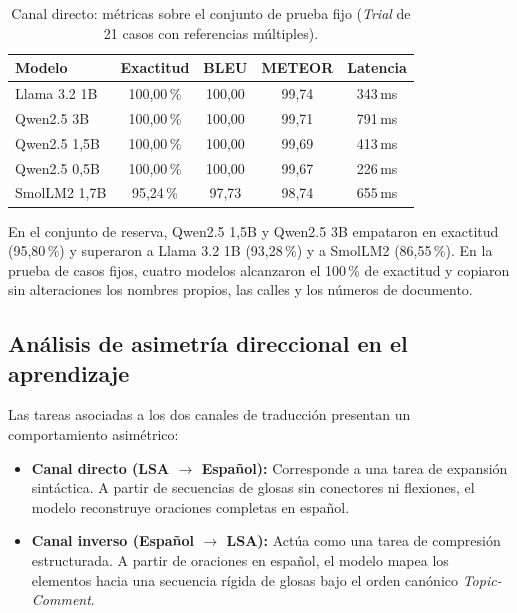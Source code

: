 \begin{table}[H]
    \centering
    \small
    \caption{Canal directo: métricas sobre el conjunto de prueba fijo (\textit{Trial} de 21 casos con referencias múltiples).}
    \label{tab:slm_trial_1310}
    \begin{tabular}{lcccc}
        \toprule
        \textbf{Modelo} & \textbf{Exactitud} & \textbf{BLEU} & \textbf{METEOR} & \textbf{Latencia} \\
        \midrule
        Llama 3.2 1B & 100{,}00\,\% & 100{,}00 & 99{,}74 & 343\,ms \\
        Qwen2.5 3B & 100{,}00\,\% & 100{,}00 & 99{,}71 & 791\,ms \\
        Qwen2.5 1,5B & 100{,}00\,\% & 100{,}00 & 99{,}69 & 413\,ms \\
        Qwen2.5 0,5B & 100{,}00\,\% & 100{,}00 & 99{,}67 & 226\,ms \\
        SmolLM2 1,7B & 95{,}24\,\% & 97{,}73 & 98{,}74 & 655\,ms \\
        \bottomrule
    \end{tabular}
\end{table}

En el conjunto de reserva, Qwen2.5 1,5B y Qwen2.5 3B empataron en exactitud (95{,}80\,\%) y superaron a Llama 3.2 1B (93{,}28\,\%) y a SmolLM2 (86{,}55\,\%). En la prueba de casos fijos, cuatro modelos alcanzaron el 100\,\% de exactitud y copiaron sin alteraciones los nombres propios, las calles y los números de documento.

\subsection{Análisis de asimetría direccional en el aprendizaje}
Las tareas asociadas a los dos canales de traducción presentan un comportamiento asimétrico:
\begin{itemize}
    \item \textbf{Canal directo (LSA $\rightarrow$ Español):} Corresponde a una tarea de expansión sintáctica. A partir de secuencias de glosas sin conectores ni flexiones, el modelo reconstruye oraciones completas en español.
    \item \textbf{Canal inverso (Español $\rightarrow$ LSA):} Actúa como una tarea de compresión estructurada. A partir de oraciones en español, el modelo mapea los elementos hacia una secuencia rígida de glosas bajo el orden canónico \textit{Topic-Comment}.
\end{itemize}

